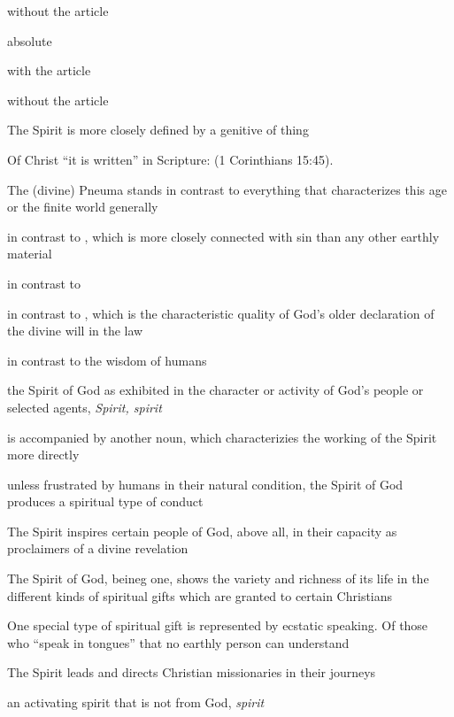 \begin{compactdesc}
\begin{compactitem}
							\item[5c$\beta$] without the article
							\item[5d] absolute
							\item[5d$\alpha$] with the article 
							\item[5d$\beta$] without the article 
							\item[5e] The Spirit is more closely defined by a genitive of thing
							\item[5f] Of Christ ``it is written'' in Scripture:  (1 Corinthians 15:45).
							\item[5g] The (divine) Pneuma stands in contrast to everything that characterizes this age or the finite world generally
							\item[5g$\alpha$] in contrast to , which is more closely connected with sin than any other earthly material
							\item[5g$\beta$] in contrast to 
							\item[5g$\gamma$] in contrast to , which is the characteristic quality of God's older declaration of the divine will in the law
							\item[5g$\delta$] in contrast to the wisdom of humans
							\item[6] the Spirit of God as exhibited in the character or activity of God's people or selected agents, \textit{Spirit, spirit}
							\item[6a]  is accompanied by another noun, which characterizies the working of the Spirit more directly
							\item[6b] unless frustrated by humans in their natural condition, the Spirit of God produces a spiritual type of conduct
							\item[6c] The Spirit inspires certain people of God, above all, in their capacity as proclaimers of a divine revelation
							\item[6d] The Spirit of God, beineg one, shows the variety and richness of its life in the different kinds of spiritual gifts which are granted to certain Christians
							\item[6e] One special type of spiritual gift is represented by ecstatic speaking. Of those who ``speak in tongues'' that no earthly person can understand
							\item[6f] The Spirit leads and directs Christian missionaries in their journeys
							\item[7] an activating spirit that is not from God, \textit{spirit}

\end{compactitem}
\end{compactdesc}
